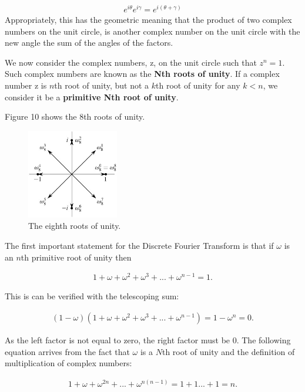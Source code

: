 \documentclass[DIV=calc, paper=a4, fontsize=11pt, twocolumn]{scrartcl}   %
\begin{document}
\begin{align}
e^{i\theta}e^{i\gamma} = e^{i(\theta+\gamma)}
\end{align}
Appropriately, this has the geometric meaning that the product of two complex numbers on the unit circle, is another complex number on the unit circle with the new angle the sum of the angles of the factors.
\par We now consider the complex numbers, z, on the unit circle such that $z^n = 1 $. Such complex numbers are known as the \textbf{Nth roots of unity}. If a complex number z is $n$th root of unity, but not a $k$th root of unity for any $k<n$, we consider it be a \textbf{primitive Nth root of unity}.

Figure 10 shows the 8th roots of unity.

\begin{figure}[h]
\centering
\includegraphics[width=40mm]{figures/eighthroots.jpg}
\caption{The eighth roots of unity. }
\label{overflow}
\end{figure}

The first important statement for the Discrete Fourier Transform is that if $\omega$ is an $n$th primitive root of unity then

\begin{align}
1 + \omega + \omega^2 + \omega^3 + ... + \omega^{n-1} = 1.
\end{align}

This is can be verified with the telescoping sum:

\begin{align}
(1 - \omega)(1 + \omega + \omega^2 + \omega^3 + ... + \omega^{n-1}) = 1 - \omega^n = 0.
\end{align}

As the left factor is not equal to zero, the right factor must be 0. The following equation arrives from the fact that $\omega$ is a $N$th root of unity and the definition of multiplication of complex numbers:

\begin{align}
1 + \omega + \omega^{2n} +  ... + \omega^{n(n-1)} = 1 + 1  ...+ 1 = n.
\end{align}
\end{document}

